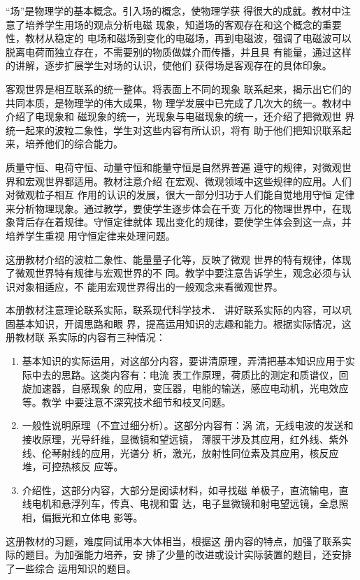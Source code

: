 “场”是物理学的基本概念。引入场的概念，使物理学获
得很大的成就。教材中注意了培养学生用场的观点分析电磁
现象，知道场的客观存在和这个概念的重要性，教材从稳定的
电场和磁场到变化的电磁场，再到电磁波，强调了电磁波可以
脱离电荷而独立存在，不需要别的物质做媒介而传播，并且具
有能量，通过这样的讲解，逐步扩展学生对场的认识，使他们
获得场是客观存在的具体印象。

客观世界是相互联系的统一整体。将表面上不同的现象
联系起来，揭示出它们的共同本质，是物理学的伟大成果，物
理学发展中已完成了几次大的统一。教材中介绍了电现象和
磁现象的统一，光现象与电磁现象的统一，还介绍了把微观世
界统一起来的波粒二象性，学生对这些内容有所认识，将有
助于他们把知识联系起来，培养他们的综合能力。

质量守恒、电荷守恒、动量守恒和能量守恒是自然界普遍
遵守的规律，对微观世界和宏观世界都适用。教材注意介绍
在宏观、微观领域中这些规律的应用。人们对微观粒子相互
作用的认识的发展，很大一部分归功于人们能自觉地用守恒
定律来分析物理现象。通过教学，要使学生逐步体会在千变
万化的物理世界中，在现象背后存在着规律。守恒定律就体
现出变化的规律，要使学生体会到这一点，并培养学生重视
用守恒定律来处理问题。

这册教材介绍的波粒二象性、能量量子化等，反映了微观
世界的特有规律，体现了微观世界特有规律与宏观世界的不
同。教学中要注意告诉学生，观念必须与认识对象相适应，不
能用宏观世界得出的一般观念来看微观世界。

本册教材注意理论联系实际，联系现代科学技术．
讲好联系实际的内容，可以巩固基本知识，开阔思路和眼
界，提高运用知识的志趣和能力。根据实际情况，这册教材联
系实际的内容有三种情况：
\begin{enumerate}
    \item 基本知识的实际运用，对这部分内容，要讲清原理，弄清把基本知识应用于实际中去的思路。这类内容有：电流
    表工作原理，荷质比的测定和质谱仪，回旋加速器，自感现象
    的应用，变压器，电能的输送，感应电动机，光电效应等。教学
    中要注意不深究技术细节和枝叉问题。
    \item 一般性说明原理（不宜过细分析）。这部分内容有：涡
    流，无线电波的发送和接收原理，光导纤维，显微镜和望远镜，
    薄膜干涉及其应用，红外线、紫外线、伦琴射线的应用，光谱分
    析，激光，放射性同位素及其应用，核反应堆，可控热核反
    应等。
    \item 介绍性，这部分内容，大部分是阅读材料，如寻找磁
    单极子，直流输电，直线电机和悬浮列车，传真、电视和雷
    达，电子显微镜和射电望远镜，全息照相，偏振光和立体电
    影等。
\end{enumerate}

这册教材的习题，难度同试用本大体相当，根据这
册内容的特点，加强了联系实际的题目。为加强能力培养，安
排了少量的改进或设计实际装置的题目，还安排了一些综合
运用知识的题目。

